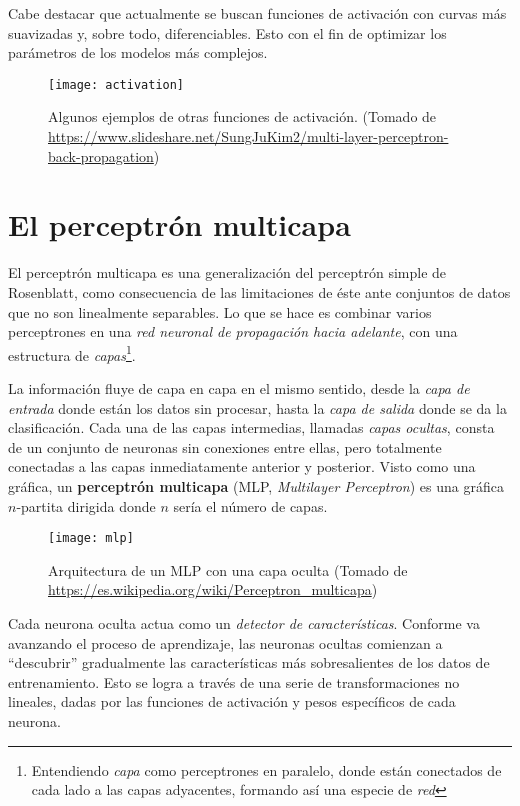 Cabe destacar que actualmente se buscan funciones de activación con
curvas más suavizadas y, sobre todo, diferenciables. Esto con el fin
de optimizar los parámetros de los modelos más complejos.

\begin{center}
\begin{figure}[H]
  \texttt{[image: activation]} \centering
  \caption{Algunos ejemplos de otras funciones de activación.  (Tomado
    de
    \url{https://www.slideshare.net/SungJuKim2/multi-layer-perceptron-back-propagation})}
\end{figure}
\end{center}

\section{El perceptrón multicapa}
El perceptrón multicapa es una generalización del perceptrón simple de
Rosenblatt, como consecuencia de las limitaciones de éste ante
conjuntos de datos que no son linealmente separables. Lo que se hace
es combinar varios perceptrones en una \textit{red neuronal de
propagación hacia adelante}, con una estructura
de \textit{capas}\footnote{Entendiendo \textit{capa} como perceptrones
en paralelo, donde están conectados de cada lado a las capas
adyacentes, formando así una especie de \textit{red}}.

La información fluye de capa en capa en el mismo sentido, desde la
\textit{capa de entrada} donde están los datos sin procesar, hasta la
\textit{capa de salida} donde se da la clasificación. Cada una de las capas
intermedias, llamadas \textit{capas ocultas}, consta de un conjunto de
neuronas sin conexiones entre ellas, pero totalmente conectadas a las
capas inmediatamente anterior y posterior. Visto como una gráfica, un
\textbf{perceptrón multicapa} (MLP, \textit{Multilayer Perceptron})
es una gráfica $n$-partita dirigida donde $n$ sería el número de
capas.
\begin{figure}[H]
  \texttt{[image: mlp]} \centering \caption{Arquitectura de
  un MLP con una capa oculta (Tomado de \url{https://es.wikipedia.org/wiki/Perceptron_multicapa})}
\end{figure}
Cada neurona oculta actua como un \textit{detector de
  características}. Conforme va avanzando el proceso de aprendizaje,
las neuronas ocultas comienzan a ``descubrir'' gradualmente las
características más sobresalientes de los datos de entrenamiento.
Esto se logra a través de una serie de transformaciones no lineales,
dadas por las funciones de activación y pesos específicos de cada
neurona.


